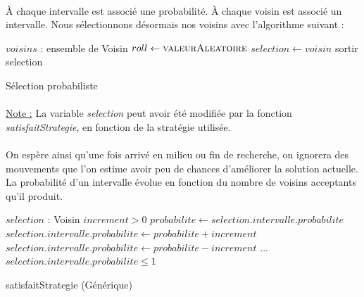 \documentclass[a4paper,10pt]{report}
\begin{document}
\paragraph{}
À chaque intervalle est associé une probabilité. À chaque voisin est associé un
intervalle. Nous sélectionnons désormais nos voisins avec l'algorithme suivant :

\begin{algorithm}[h]
  \begin{algorithmic}
    \Require $voisins$ : ensemble de Voisin
      \State $roll\gets \Call{valeurAleatoire}{}$
	\State $selection \gets voisin$
	\State sortir
      \EndIf
    \EndFor
      \Return selection
    \EndIf
  \end{algorithmic}
  \caption{Sélection probabiliste}
\end{algorithm}

\paragraph{}
\underline{Note :} La variable \textit{selection} peut avoir été modifiée par la
fonction \textit{satisfaitStrategie}, en fonction de la stratégie utilisée.

\paragraph{}
  On espère ainsi qu'une fois arrivé en milieu ou fin de recherche, on ignorera
des mouvements que l'on estime avoir peu de chances d'améliorer la solution
actuelle. La probabilité d'un intervalle évolue en fonction du nombre de voisins
acceptants qu'il produit.


\begin{algorithm}[h]
  \begin{algorithmic}
    \Require $selection$ : Voisin
    \Require $increment > 0$
    \State 
    \State $probabilite \gets selection.intervalle.probabilite$
      \State $selection.intervalle.probabilite \gets probabilite + increment$
    \Else
      \State $selection.intervalle.probabilite \gets probabilite - increment$
    \EndIf
    \State ...
    \Ensure $selection.intervalle.probabilite \leq 1$
  \end{algorithmic}
  \caption{satisfaitStrategie (Générique)}
\end{algorithm}
\end{document}
